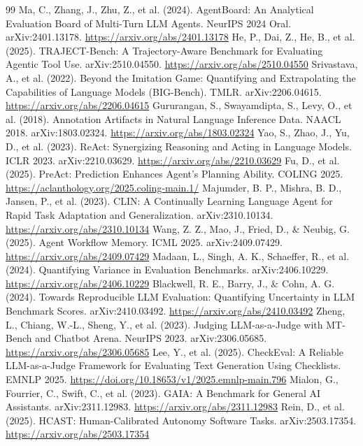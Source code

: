 \begin{thebibliography}{99}
 Ma, C., Zhang, J., Zhu, Z., et al. (2024). AgentBoard: An Analytical Evaluation Board of Multi-Turn LLM Agents. NeurIPS 2024 Oral. arXiv:2401.13178. \url{https://arxiv.org/abs/2401.13178}
 He, P., Dai, Z., He, B., et al. (2025). TRAJECT-Bench: A Trajectory-Aware Benchmark for Evaluating Agentic Tool Use. arXiv:2510.04550. \url{https://arxiv.org/abs/2510.04550}
 Srivastava, A., et al. (2022). Beyond the Imitation Game: Quantifying and Extrapolating the Capabilities of Language Models (BIG-Bench). TMLR. arXiv:2206.04615. \url{https://arxiv.org/abs/2206.04615}
 Gururangan, S., Swayamdipta, S., Levy, O., et al. (2018). Annotation Artifacts in Natural Language Inference Data. NAACL 2018. arXiv:1803.02324. \url{https://arxiv.org/abs/1803.02324}
 Yao, S., Zhao, J., Yu, D., et al. (2023). ReAct: Synergizing Reasoning and Acting in Language Models. ICLR 2023. arXiv:2210.03629. \url{https://arxiv.org/abs/2210.03629}
 Fu, D., et al. (2025). PreAct: Prediction Enhances Agent's Planning Ability. COLING 2025. \url{https://aclanthology.org/2025.coling-main.1/}
 Majumder, B. P., Mishra, B. D., Jansen, P., et al. (2023). CLIN: A Continually Learning Language Agent for Rapid Task Adaptation and Generalization. arXiv:2310.10134. \url{https://arxiv.org/abs/2310.10134}
 Wang, Z. Z., Mao, J., Fried, D., \& Neubig, G. (2025). Agent Workflow Memory. ICML 2025. arXiv:2409.07429. \url{https://arxiv.org/abs/2409.07429}
 Madaan, L., Singh, A. K., Schaeffer, R., et al. (2024). Quantifying Variance in Evaluation Benchmarks. arXiv:2406.10229. \url{https://arxiv.org/abs/2406.10229}
 Blackwell, R. E., Barry, J., \& Cohn, A. G. (2024). Towards Reproducible LLM Evaluation: Quantifying Uncertainty in LLM Benchmark Scores. arXiv:2410.03492. \url{https://arxiv.org/abs/2410.03492}
 Zheng, L., Chiang, W.-L., Sheng, Y., et al. (2023). Judging LLM-as-a-Judge with MT-Bench and Chatbot Arena. NeurIPS 2023. arXiv:2306.05685. \url{https://arxiv.org/abs/2306.05685}
 Lee, Y., et al. (2025). CheckEval: A Reliable LLM-as-a-Judge Framework for Evaluating Text Generation Using Checklists. EMNLP 2025. \url{https://doi.org/10.18653/v1/2025.emnlp-main.796}
 Mialon, G., Fourrier, C., Swift, C., et al. (2023). GAIA: A Benchmark for General AI Assistants. arXiv:2311.12983. \url{https://arxiv.org/abs/2311.12983}
 Rein, D., et al. (2025). HCAST: Human-Calibrated Autonomy Software Tasks. arXiv:2503.17354. \url{https://arxiv.org/abs/2503.17354}

\end{thebibliography}
